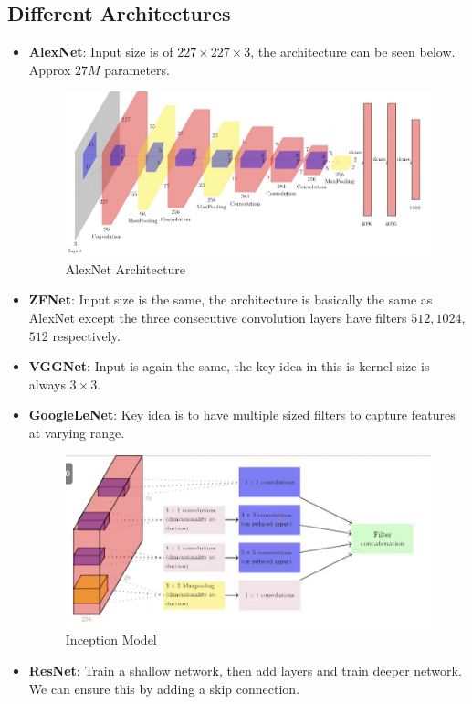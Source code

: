 \documentclass[a4paper]{article}
\begin{document}
\subsection{Different Architectures}
\begin{itemize}
    \item \textbf{AlexNet}: Input size is of $227\times 227\times 3$, the architecture can be seen below. Approx $27M$ parameters.
    \begin{figure}[H]
        \centering
        \includegraphics[width=\linewidth]{Degree//static/DL_AlexNet_Architecture.png}
        \caption{AlexNet Architecture}
    \end{figure}
    \item \textbf{ZFNet}: Input size is the same, the architecture is basically the same as AlexNet except the three consecutive convolution layers have filters $512,1024$, $512$ respectively.
    \item \textbf{VGGNet}: Input is again the same, the key idea in this is kernel size is always $3\times 3$.
    \item \textbf{GoogleLeNet}: Key idea is to have multiple sized filters to capture features at varying range.
    \begin{figure}[H]
        \centering
        \includegraphics[width=\linewidth]{Degree//static/DL_Inception_Model.png}
        \caption{Inception Model}
    \end{figure}
    \item \textbf{ResNet}: Train a shallow network, then add layers and train deeper network. We can ensure this by adding a skip connection.
\end{itemize}
\pagebreak
\end{document}
